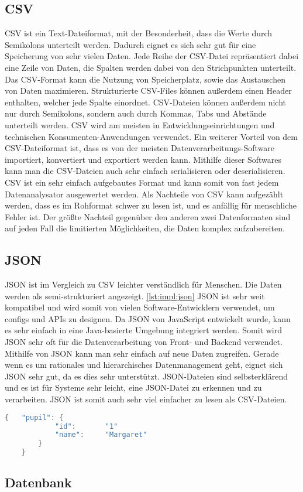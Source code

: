 \subsection{CSV}
CSV ist ein Text-Dateiformat, mit der Besonderheit, dass die Werte durch Semikolons unterteilt werden. Dadurch eignet es sich sehr gut für eine Speicherung von sehr vielen Daten. Jede Reihe der CSV-Datei repräsentiert dabei eine Zeile von Daten, die Spalten werden dabei von den Strichpunkten unterteilt. Das CSV-Format kann die Nutzung von Speicherplatz, sowie das Austauschen von Daten maximieren. Strukturierte CSV-Files können außerdem einen Header enthalten, welcher jede Spalte einordnet. CSV-Dateien können außerdem nicht nur durch Semikolons, sondern auch durch Kommas, Tabs und Abstände unterteilt werden. CSV wird am meisten in Entwicklungseinrichtungen und technischen Konsumenten-Anwendungen verwendet. Ein weiterer Vorteil von dem CSV-Dateiformat ist, dass es von der meisten Datenverarbeitungs-Software importiert, konvertiert und exportiert werden kann. Mithilfe dieser Softwares kann man die CSV-Dateien auch sehr einfach serialisieren oder deserialisieren. CSV ist ein sehr einfach aufgebautes Format und kann somit von fast jedem Datenanalysator ausgewertet werden. Als Nachteile von CSV kann aufgezählt werden, dass es im Rohformat schwer zu lesen ist, und es anfällig für menschliche Fehler ist. Der größte Nachteil gegenüber den anderen zwei Datenformaten sind auf jeden Fall die limitierten Möglichkeiten, die Daten komplex aufzubereiten.   


\subsection{JSON}
JSON ist im Vergleich zu CSV leichter verständlich für Menschen. Die Daten werden als semi-strukturiert angezeigt. \ref{lst:impl:json} JSON ist sehr weit kompatibel und wird somit von vielen Software-Entwicklern verwendet, um configs und APIs zu designen. Da JSON von JavaScript entwickelt wurde, kann es sehr einfach in eine Java-basierte Umgebung integriert werden. Somit wird JSON sehr oft für die Datenverarbeitung von Front- und Backend verwendet. Mithilfe von JSON kann man sehr einfach auf neue Daten zugreifen. Gerade wenn es um rationales und hierarchisches Datenmanagement geht, eignet sich JSON sehr gut, da es dies sehr unterstützt. JSON-Dateien sind selbsterklärend und es ist für Systeme sehr leicht, eine JSON-Datei zu erkennen und zu verarbeiten. JSON ist somit auch sehr viel einfacher zu lesen als CSV-Dateien. 


\begin{lstlisting}[language=java,caption=JSON Beispiel,label=lst:impl:json]
    {   "pupil": {
            "id":       "1"
            "name":     "Margaret"
        }
    }
\end{lstlisting}

\subsection{Datenbank}